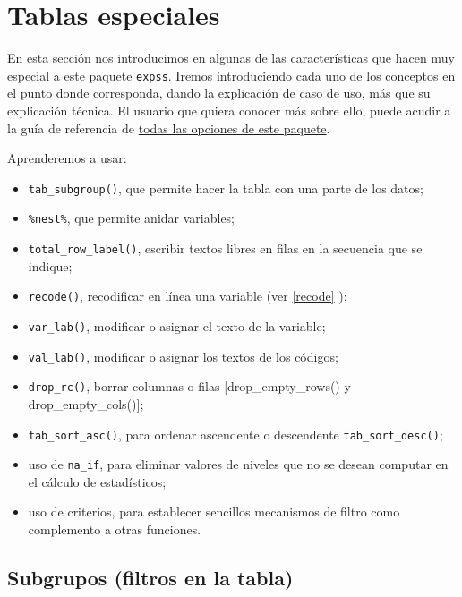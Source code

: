 \documentclass[
]{book}
\providecommand{\tightlist}{%
  \setlength{\itemsep}{0pt}\setlength{\parskip}{0pt}}
\begin{document}
\hypertarget{tse05}{%
\chapter{Tablas especiales}\label{tse05}}

En esta sección nos introducimos en algunas de las características que hacen muy especial a este paquete \texttt{expss}. Iremos introduciendo cada uno de los conceptos en el punto donde corresponda, dando la explicación de caso de uso, más que su explicación técnica. El usuario que quiera conocer más sobre ello, puede acudir a la guía de referencia de \href{https://rdrr.io/cran/expss/man/}{todas las opciones de este paquete}.

Aprenderemos a usar:

\begin{itemize}
\tightlist
\item
  \texttt{tab\_subgroup()}, que permite hacer la tabla con una parte de los datos;
\item
  \texttt{\%nest\%}, que permite anidar variables;
\item
  \texttt{total\_row\_label()}, escribir textos libres en filas en la secuencia que se indique;
\item
  \texttt{recode()}, recodificar en línea una variable (ver \ref{recode} );
\item
  \texttt{var\_lab()}, modificar o asignar el texto de la variable;
\item
  \texttt{val\_lab()}, modificar o asignar los textos de los códigos;
\item
  \texttt{drop\_rc()}, borrar columnas o filas {[}drop\_empty\_rows() y drop\_empty\_cols(){]};
\item
  \texttt{tab\_sort\_asc()}, para ordenar ascendente o descendente \texttt{tab\_sort\_desc()};
\item
  uso de \texttt{na\_if}, para eliminar valores de niveles que no se desean computar en el cálculo de estadísticos;
\item
  uso de criterios, para establecer sencillos mecanismos de filtro como complemento a otras funciones.
\end{itemize}

\hypertarget{subgrupos-filtros-en-la-tabla}{%
\section{Subgrupos (filtros en la tabla)}\label{subgrupos-filtros-en-la-tabla}}
\end{document}
